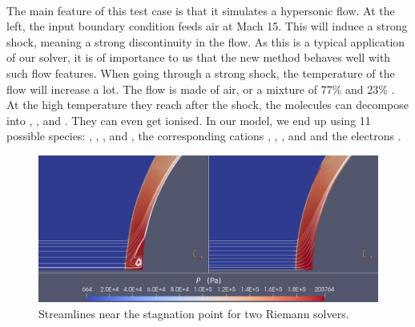        \paragraph{}
        The main feature of this test case is that it simulates a hypersonic flow.
        At the left, the input boundary condition feeds air at Mach 15.
        This will induce a strong shock, meaning a strong discontinuity in the flow.
        As this is a typical application of our solver, it is of importance to us that the new method behaves well with such flow features.
        When going through a strong shock, the temperature of the flow will increase a lot.
        The flow is made of air, or a mixture of 77\%  and 23\% .
        At the high temperature they reach after the shock, the molecules can decompose into , , and .
        They can even get ionised.
        In our model, we end up using 11 possible species: , , ,  and , the corresponding cations , , ,  and  and the electrons .

        \begin{figure}
          \centering
          \includegraphics[width=\textwidth]{figures/sphere_carbuncle.png}
          \caption{Streamlines near the stagnation point for two Riemann solvers.}
          \label{fig:sphere_carbuncle}
        \end{figure}

